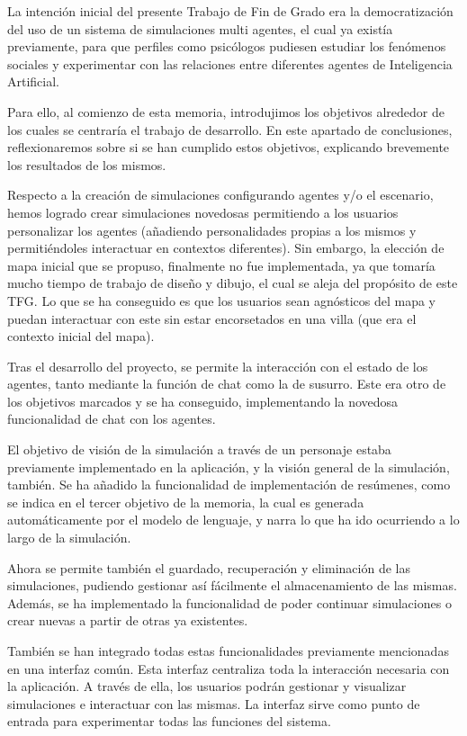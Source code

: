 La intención inicial del presente Trabajo de Fin de Grado era la democratización del uso de un sistema de simulaciones multi agentes, el cual ya existía previamente, para que perfiles como psicólogos pudiesen estudiar los fenómenos sociales y experimentar con las relaciones entre diferentes agentes de Inteligencia Artificial.

Para ello, al comienzo de esta memoria, introdujimos los objetivos alrededor de los cuales se centraría el trabajo de desarrollo. En este apartado de conclusiones, reflexionaremos sobre si se han cumplido estos objetivos, explicando brevemente los resultados de los mismos.

Respecto a la creación de simulaciones configurando agentes y/o el escenario, hemos logrado crear simulaciones novedosas permitiendo a los usuarios personalizar los agentes (añadiendo personalidades propias a los mismos y permitiéndoles interactuar en contextos diferentes). Sin embargo, la elección de mapa inicial que se propuso, finalmente no fue implementada, ya que tomaría mucho tiempo de trabajo de diseño y dibujo, el cual se aleja del propósito de este TFG. Lo que se ha conseguido es que los usuarios sean agnósticos del mapa y puedan interactuar con este sin estar encorsetados en una villa (que era el contexto inicial del mapa).

Tras el desarrollo del proyecto, se permite la interacción con el estado de los agentes, tanto mediante la función de chat como la de susurro. Este era otro de los objetivos marcados y se ha conseguido, implementando la novedosa funcionalidad de chat con los agentes.

El objetivo de visión de la simulación a través de un personaje estaba previamente implementado en la aplicación, y la visión general de la simulación, también. Se ha añadido la funcionalidad de implementación de resúmenes, como se indica en el tercer objetivo de la memoria, la cual es generada automáticamente por el modelo de lenguaje, y narra lo que ha ido ocurriendo a lo largo de la simulación.

Ahora se permite también el guardado, recuperación y eliminación de las simulaciones, pudiendo gestionar así fácilmente el almacenamiento de las mismas. Además, se ha implementado la funcionalidad de poder continuar simulaciones o crear nuevas a partir de otras ya existentes.

También se han integrado todas estas funcionalidades previamente mencionadas en una interfaz común. Esta interfaz centraliza toda la interacción necesaria con la aplicación. A través de ella, los usuarios podrán gestionar y visualizar simulaciones e interactuar con las mismas. La interfaz sirve como punto de entrada para experimentar todas las funciones del sistema.

